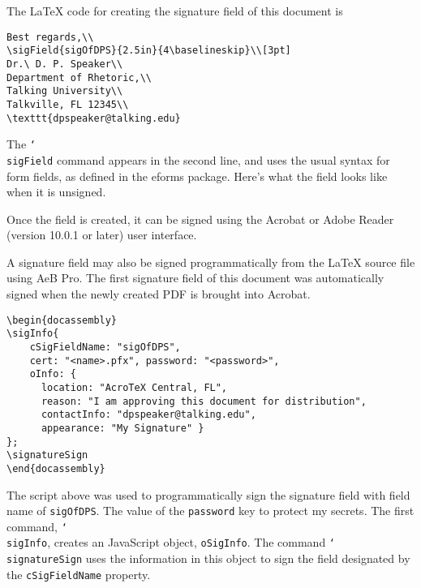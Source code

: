 \documentclass[12pt]{article}
\newcommand{\cs}[1]{\texttt{\char`\\#1}}
\begin{document}
The {\LaTeX} code for creating the signature field of this document is
\begin{Verbatim}[xleftmargin=20pt,fontsize=\small]
Best regards,\\
\sigField{sigOfDPS}{2.5in}{4\baselineskip}\\[3pt]
Dr.\ D. P. Speaker\\
Department of Rhetoric,\\
Talking University\\
Talkville, FL 12345\\
\texttt{dpspeaker@talking.edu}
\end{Verbatim}
The \cs{sigField} command appears in the second line, and uses the usual
syntax for form fields, as defined in the \textsf{eforms} package.
Here's what the field looks like when it is unsigned.


Once the field is created, it can be signed using the Acrobat or Adobe
Reader (version 10.0.1 or later) user interface.

A signature field may also be signed programmatically from the {\LaTeX}
source file using AeB Pro. The first signature field of this document
was automatically signed when the newly created PDF is brought into
Acrobat.
\begin{Verbatim}[xleftmargin=20pt,fontsize=\footnotesize]
\begin{docassembly}
\sigInfo{
    cSigFieldName: "sigOfDPS",
    cert: "<name>.pfx", password: "<password>",
    oInfo: {
      location: "AcroTeX Central, FL",
      reason: "I am approving this document for distribution",
      contactInfo: "dpspeaker@talking.edu",
      appearance: "My Signature" }
};
\signatureSign
\end{docassembly}
\end{Verbatim}
The script above was used to programmatically sign the signature field
with field name of \texttt{sigOfDPS}. The value of the \texttt{password}
key to protect my secrets. The first command, \cs{sigInfo}, creates an
JavaScript object, \texttt{oSigInfo}. The command \cs{signatureSign} uses
the information in this object to sign the field designated by the
\texttt{cSigFieldName} property.
\end{document}

